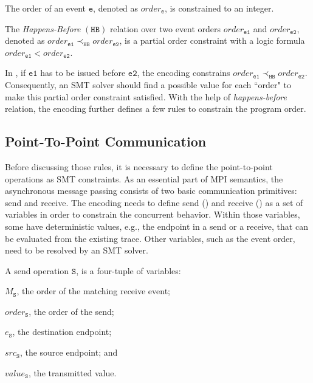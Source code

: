 \begin{definition}[Order]\label{def:order}
The order of an event $\mathtt{e}$, denoted as $\mathit{order}_\mathtt{e}$, is constrained to an integer.
\end{definition}

\begin{definition}\label{def:happens-before}
The \emph{Happens-Before} $(\mathtt{HB})$ relation over two event orders $\mathit{order}_\mathtt{e1}$ and $\mathit{order}_\mathtt{e2}$, denoted as
$\mathit{order}_\mathtt{e1} \mathrm{\prec_\mathtt{HB}} \mathit{order}_\mathtt{e2}$, is a partial order constraint with a logic formula $\mathit{order}_\mathtt{e1} <  \mathit{order}_\mathtt{e2}$. 
\label{def:hb}
\end{definition}

In , if $\mathtt{e1}$ has to be issued before $\mathtt{e2}$, the encoding constrains $\mathit{order}_\mathtt{e1} \mathrm{\prec_\mathtt{HB}} \mathit{order}_\mathtt{e2}$. Consequently, an SMT solver should find a possible value for each ``order" to make this partial order constraint satisfied. With the help of \emph{happens-before} relation, the encoding further defines a few rules to constrain the program order. 

\subsection{Point-To-Point Communication}
Before discussing those rules, it is necessary to define the point-to-point operations as SMT constraints. As an essential part of MPI semantics, the asynchronous message passing consists of two basic communication primitives: send and receive. The encoding needs to define send () and receive () as a set of variables in order to constrain the concurrent behavior. Within those variables, some have deterministic values, e.g., the endpoint in a send or a receive, that can be evaluated from the existing trace. Other variables, such as the event order, need to be resolved by an SMT solver. 
 
\begin{definition}[Send] \label{def:snd}
A send operation $\mathtt{S}$, is a four-tuple of variables:
\begin{compactenum}
\item $M_\mathtt{S}$, the order of the matching receive event;
\item $\mathit{order}_\mathtt{S}$, the order of the send;
\item $e_\mathtt{S}$, the destination endpoint; 
\item $src_\mathtt{S}$, the source endpoint; and
\item $\mathit{value}_\mathtt{S}$, the transmitted value.
\end{compactenum}
\end{definition}

